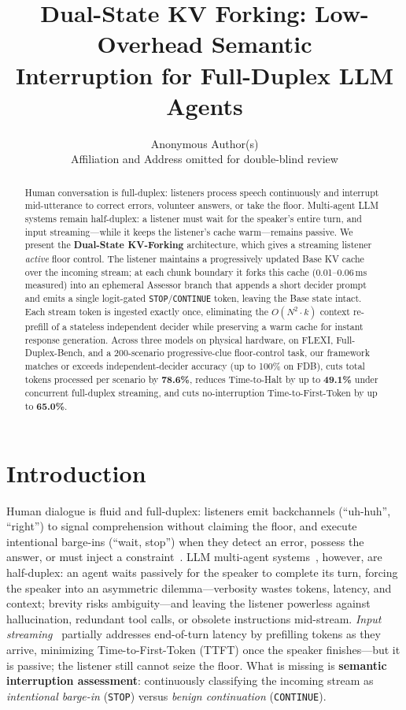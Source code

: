 \documentclass{article}
\title{Dual-State KV Forking: Low-Overhead Semantic \\ Interruption for Full-Duplex LLM Agents}
\author{%
  Anonymous Author(s) \\
  Affiliation and Address omitted for double-blind review \\
}
\begin{document}
\maketitle

\begin{abstract}
Human conversation is full-duplex: listeners process speech continuously and interrupt mid-utterance to correct errors, volunteer answers, or take the floor. Multi-agent LLM systems remain half-duplex: a listener must wait for the speaker's entire turn, and input streaming---while it keeps the listener's cache warm---remains passive. We present the \textbf{Dual-State KV-Forking} architecture, which gives a streaming listener \emph{active} floor control. The listener maintains a progressively updated Base KV cache over the incoming stream; at each chunk boundary it forks this cache (0.01--0.06\,ms measured) into an ephemeral Assessor branch that appends a short decider prompt and emits a single logit-gated \texttt{STOP}/\texttt{CONTINUE} token, leaving the Base state intact. Each stream token is ingested exactly once, eliminating the $O(N^2 \cdot k)$ context re-prefill of a stateless independent decider while preserving a warm cache for instant response generation. Across three models on physical hardware, on FLEXI, Full-Duplex-Bench, and a 200-scenario progressive-clue floor-control task, our framework matches or exceeds independent-decider accuracy (up to 100\% on FDB), cuts total tokens processed per scenario by \textbf{78.6\%}, reduces Time-to-Halt by up to \textbf{49.1\%} under concurrent full-duplex streaming, and cuts no-interruption Time-to-First-Token by up to \textbf{65.0\%}.
\end{abstract}

\section{Introduction}
\label{sec:intro}

Human dialogue is fluid and full-duplex: listeners emit backchannels (``uh-huh'', ``right'') to signal comprehension without claiming the floor, and execute intentional barge-ins (``wait, stop'') when they detect an error, possess the answer, or must inject a constraint~\citep{sacks1974turntaking, yngve1970, skantze2021review}. LLM multi-agent systems~\citep{wu2023autogen, li2023camel}, however, are half-duplex: an agent waits passively for the speaker to complete its turn, forcing the speaker into an asymmetric dilemma---verbosity wastes tokens, latency, and context; brevity risks ambiguity---and leaving the listener powerless against hallucination, redundant tool calls, or obsolete instructions mid-stream. \emph{Input streaming}~\citep{xiao2023streamingllm, agrawal2023sarathi} partially addresses end-of-turn latency by prefilling tokens as they arrive, minimizing Time-to-First-Token (TTFT) once the speaker finishes---but it is passive; the listener still cannot seize the floor. What is missing is \textbf{semantic interruption assessment}: continuously classifying the incoming stream as \emph{intentional barge-in} (\texttt{STOP}) versus \emph{benign continuation} (\texttt{CONTINUE}).
\end{document}
